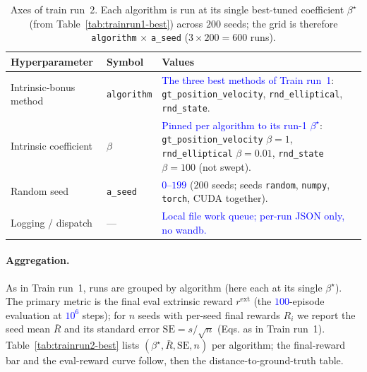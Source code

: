 \begin{table}[H]
\centering
\footnotesize
\setlength{\tabcolsep}{5pt}
\renewcommand{\arraystretch}{1.2}
\begin{tabular}{@{}>{\raggedright\arraybackslash}p{3.4cm} >{\raggedright\arraybackslash}p{2.1cm} >{\raggedright\arraybackslash}p{7.0cm}@{}}
\toprule
\textbf{Hyperparameter} & \textbf{Symbol} & \textbf{Values} \\
\midrule
Intrinsic-bonus method & \texttt{algorithm} & \textcolor{blue}{The three best methods of Train run~1}: \texttt{gt\_position\_velocity}, \texttt{rnd\_elliptical}, \texttt{rnd\_state}. \\
Intrinsic coefficient & $\beta$ & \textcolor{blue}{Pinned per algorithm to its run-1 $\beta^\star$}: \texttt{gt\_position\_velocity} $\beta{=}1$, \texttt{rnd\_elliptical} $\beta{=}0.01$, \texttt{rnd\_state} $\beta{=}100$ (not swept). \\
Random seed & \texttt{a\_seed} & \textcolor{blue}{$0$--$199$} ($200$ seeds; seeds \texttt{random}, \texttt{numpy}, \texttt{torch}, CUDA together). \\
Logging / dispatch & --- & \textcolor{blue}{Local file work queue; per-run JSON only, no wandb.} \\
\bottomrule
\end{tabular}
\caption{Axes of train run~2. Each algorithm is run at its single best-tuned coefficient
$\beta^\star$ (from Table~\ref{tab:trainrun1-best}) across $200$ seeds; the grid is therefore
\texttt{algorithm} $\times$ \texttt{a\_seed} ($3\times200=600$ runs).}
\label{tab:trainrun2-sweep}
\end{table}

\paragraph{Aggregation.}
As in Train run~1, runs are grouped by algorithm (here each at its single $\beta^\star$). The primary
metric is the final eval extrinsic reward $r^{\mathrm{ext}}$ (the
\textcolor{blue}{$100$}-episode evaluation at \textcolor{blue}{$10^{6}$} steps); for $n$ seeds with
per-seed final rewards $R_i$ we report the seed mean $\bar{R}$ and its standard error
$\mathrm{SE}=s/\sqrt{n}$ (Eqs. as in Train run~1). Table~\ref{tab:trainrun2-best} lists
$(\beta^\star,\bar{R},\mathrm{SE},n)$ per algorithm; the final-reward bar and the eval-reward curve
follow, then the distance-to-ground-truth table.

